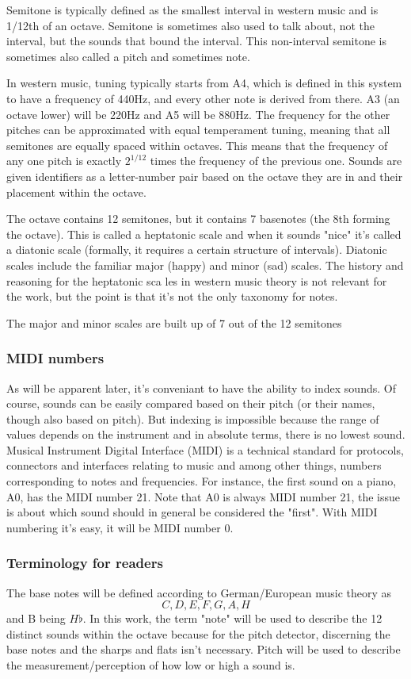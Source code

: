 Semitone is typically defined as the smallest interval in western music and is 1/12th of an octave. Semitone is sometimes also used to talk about, not the interval, but the sounds that bound the interval. This non-interval semitone is sometimes also called a pitch and sometimes note.

In western music, tuning typically starts from A4, which is defined in this system to have a frequency of 440Hz, and every other note is derived from there. A3 (an octave lower) will be 220Hz and A5 will be 880Hz. The frequency for the other pitches can be approximated with equal temperament tuning, meaning that all semitones are equally spaced within octaves. This means that the frequency of any one pitch is exactly $2^{1/12}$ times the frequency of the previous one. Sounds are given identifiers as a letter-number pair based on the octave they are in and their placement within the octave. 

The octave contains 12 semitones, but it contains 7 basenotes (the 8th forming the octave). This is called a heptatonic scale and when it sounds "nice" it's called a diatonic scale (formally, it requires a certain structure of intervals). Diatonic scales include the familiar major (happy) and minor (sad) scales. The history and reasoning for the heptatonic sca  les in western music theory is not relevant for the work, but the point is that it's not the only taxonomy for notes. 

The major and minor scales are built up of 7 out of the 12 semitones

\subsubsection{MIDI numbers}
As will be apparent later, it's conveniant to have the ability to index sounds. Of course, sounds can be easily compared based on their pitch (or their names, though also based on pitch). But indexing is impossible because the range of values depends on the instrument and in absolute terms, there is no lowest sound.  
Musical Instrument Digital Interface (MIDI) is a technical standard for protocols, connectors and interfaces relating to music and among other things, numbers corresponding to notes and frequencies. For instance, the first sound on a piano, A0, has the MIDI number 21. Note that A0 is always MIDI number 21, the issue is about which sound should in general be considered the "first". With MIDI numbering it's easy, it will be MIDI number 0. 

\subsubsection{Terminology for readers}
The base notes will be defined according to German/European music theory as \[C, D, E, F, G, A, H\] and B being $H\flat$. In this work, the term "note" will be used to describe the 12 distinct sounds within the octave because for the pitch detector, discerning the base notes and the sharps and flats isn't necessary. Pitch will be used to describe the measurement/perception of how low or high a sound is. 




